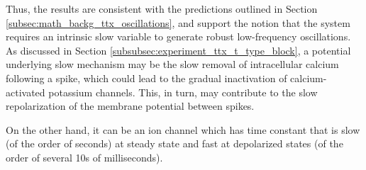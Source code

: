\documentclass[../main.tex]{subfiles}
\begin{document}
Thus, the results are consistent with the predictions outlined in Section \ref{subsec:math_backg_ttx_oscillations}, and support the notion that the system requires an intrinsic slow variable to generate robust low-frequency oscillations. As discussed in Section \ref{subsubsec:experiment_ttx_t_type_block}, a potential underlying slow mechanism may be the slow removal of intracellular calcium following a spike, which could lead to the gradual inactivation of calcium-activated potassium channels. This, in turn, may contribute to the slow repolarization of the membrane potential between spikes.

On the other hand, it can be an ion channel which has time constant that is slow (of the order of seconds) at steady state and fast at depolarized states (of the order of several 10s of milliseconds).
\end{document}
